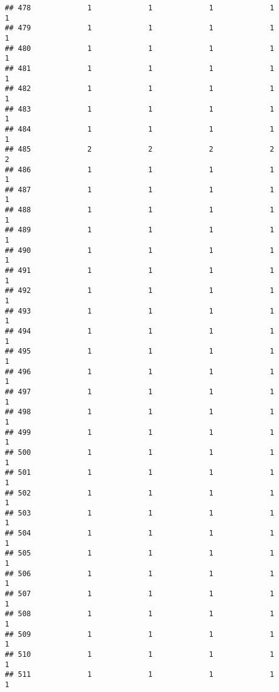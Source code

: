 \documentclass[
]{article}
\begin{document}
\begin{verbatim}
## 478             1             1             1             1             1
## 479             1             1             1             1             1
## 480             1             1             1             1             1
## 481             1             1             1             1             1
## 482             1             1             1             1             1
## 483             1             1             1             1             1
## 484             1             1             1             1             1
## 485             2             2             2             2             2
## 486             1             1             1             1             1
## 487             1             1             1             1             1
## 488             1             1             1             1             1
## 489             1             1             1             1             1
## 490             1             1             1             1             1
## 491             1             1             1             1             1
## 492             1             1             1             1             1
## 493             1             1             1             1             1
## 494             1             1             1             1             1
## 495             1             1             1             1             1
## 496             1             1             1             1             1
## 497             1             1             1             1             1
## 498             1             1             1             1             1
## 499             1             1             1             1             1
## 500             1             1             1             1             1
## 501             1             1             1             1             1
## 502             1             1             1             1             1
## 503             1             1             1             1             1
## 504             1             1             1             1             1
## 505             1             1             1             1             1
## 506             1             1             1             1             1
## 507             1             1             1             1             1
## 508             1             1             1             1             1
## 509             1             1             1             1             1
## 510             1             1             1             1             1
## 511             1             1             1             1             1

\end{verbatim}
\end{document}
